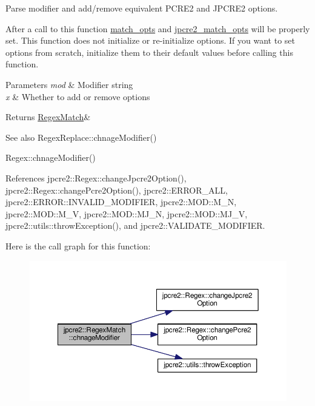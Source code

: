 Parse modifier and add/remove equivalent P\+C\+R\+E2 and J\+P\+C\+R\+E2 options. 

After a call to this function \hyperlink{classjpcre2_1_1RegexMatch_a697d5731007350b0f20d2018fcfafa90}{match\+\_\+opts} and \hyperlink{classjpcre2_1_1RegexMatch_a70d62df887eeed237724f64fbc378700}{jpcre2\+\_\+match\+\_\+opts} will be properly set. This function does not initialize or re-\/initialize options. If you want to set options from scratch, initialize them to their default values before calling this function. 
\begin{DoxyParams}{Parameters}
{\em mod} & Modifier string \\
\hline
{\em x} & Whether to add or remove options \\
\hline
\end{DoxyParams}
\begin{DoxyReturn}{Returns}
\hyperlink{classjpcre2_1_1RegexMatch}{Regex\+Match}\& 
\end{DoxyReturn}
\begin{DoxySeeAlso}{See also}
Regex\+Replace\+::chnage\+Modifier() 

Regex\+::chnage\+Modifier() 
\end{DoxySeeAlso}


References jpcre2\+::\+Regex\+::change\+Jpcre2\+Option(), jpcre2\+::\+Regex\+::change\+Pcre2\+Option(), jpcre2\+::\+E\+R\+R\+O\+R\+\_\+\+A\+LL, jpcre2\+::\+E\+R\+R\+O\+R\+::\+I\+N\+V\+A\+L\+I\+D\+\_\+\+M\+O\+D\+I\+F\+I\+ER, jpcre2\+::\+M\+O\+D\+::\+M\+\_\+N, jpcre2\+::\+M\+O\+D\+::\+M\+\_\+V, jpcre2\+::\+M\+O\+D\+::\+M\+J\+\_\+N, jpcre2\+::\+M\+O\+D\+::\+M\+J\+\_\+V, jpcre2\+::utils\+::throw\+Exception(), and jpcre2\+::\+V\+A\+L\+I\+D\+A\+T\+E\+\_\+\+M\+O\+D\+I\+F\+I\+ER.



Here is the call graph for this function\+:\nopagebreak
\begin{figure}[H]
\begin{center}
\leavevmode
\includegraphics[width=350pt]{classjpcre2_1_1RegexMatch_a7f5283c0fd9b4514b37354a08562ff9e_cgraph}
\end{center}
\end{figure}



